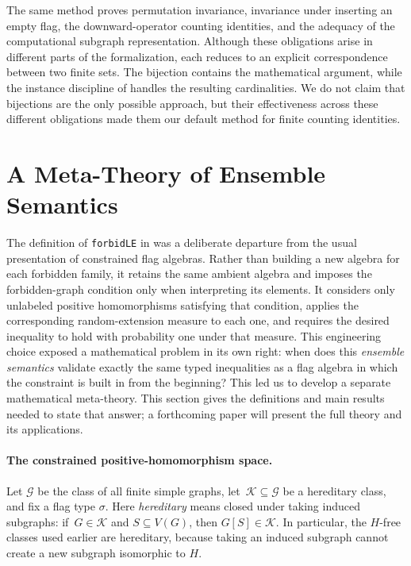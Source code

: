 \documentclass{article}
\newcommand{\lean}[1]{\texttt{#1}}
\begin{document}
The same method proves permutation invariance, invariance under inserting an
empty flag, the downward-operator counting identities, and the adequacy of
the computational subgraph representation.  Although these obligations arise
in different parts of the formalization, each reduces to an explicit
correspondence between two finite sets.  The bijection contains the
mathematical argument, while the instance discipline of
 handles the resulting cardinalities.  We do not claim
that bijections are the only possible approach, but their effectiveness
across these different obligations made them our default method for finite
counting identities.



\section{A Meta-Theory of Ensemble Semantics}
\label{sec:metatheory}

The definition of \lean{forbidLE} in  was a deliberate
departure from the usual presentation of constrained flag algebras.  Rather
than building a new algebra for each forbidden family, it retains the same
ambient algebra and imposes the forbidden-graph condition only when
interpreting its elements.  It considers only unlabeled positive
homomorphisms satisfying that condition, applies the corresponding
random-extension measure to each one, and requires the desired inequality to
hold with probability one under that measure.
This engineering choice exposed a mathematical problem in its own right:
when does this \emph{ensemble semantics} validate exactly the same typed
inequalities as a flag algebra in which the constraint is built in from the
beginning?  This led us to develop a separate mathematical meta-theory.
This section gives the definitions and main results needed to state that answer;
a forthcoming paper will present the full theory and its applications.

\paragraph{The constrained positive-homomorphism space.}
Let \(\mathcal G\) be the class of all finite simple graphs, let~\(\mathcal K\subseteq\mathcal G\) be a hereditary class, and fix a flag type
\(\sigma\).  Here \emph{hereditary} means closed under taking induced
subgraphs: if~\(G\in\mathcal K\) and \(S\subseteq V(G)\), then
\(G[S]\in\mathcal K\).  In particular, the \(H\)-free classes used earlier are
hereditary, because taking an induced subgraph cannot create a new
subgraph isomorphic to \(H\).
\end{document}
